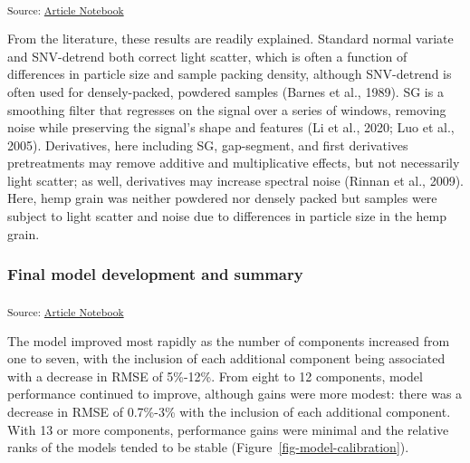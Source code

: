 \documentclass[
]{agujournal2019}
\begin{document}
\textsubscript{Source:
\href{https://rvcrawford.github.io/glowing-system/index.qmd.html}{Article
Notebook}}

From the literature, these results are readily explained. Standard
normal variate and SNV-detrend both correct light scatter, which is
often a function of differences in particle size and sample packing
density, although SNV-detrend is often used for densely-packed, powdered
samples (Barnes et al., 1989). SG is a smoothing filter that regresses
on the signal over a series of windows, removing noise while preserving
the signal's shape and features (Li et al., 2020; Luo et al., 2005).
Derivatives, here including SG, gap-segment, and first derivatives
pretreatments may remove additive and multiplicative effects, but not
necessarily light scatter; as well, derivatives may increase spectral
noise (Rinnan et al., 2009). Here, hemp grain was neither powdered nor
densely packed but samples were subject to light scatter and noise due
to differences in particle size in the hemp grain.

\subsubsection{Final model development and
summary}\label{final-model-development-and-summary}

\textsubscript{Source:
\href{https://rvcrawford.github.io/glowing-system/index.qmd.html}{Article
Notebook}}

The model improved most rapidly as the number of components increased
from one to seven, with the inclusion of each additional component being
associated with a decrease in RMSE of 5\%-12\%. From eight to 12
components, model performance continued to improve, although gains were
more modest: there was a decrease in RMSE of 0.7\%-3\% with the
inclusion of each additional component. With 13 or more components,
performance gains were minimal and the relative ranks of the models
tended to be stable (Figure~\ref{fig-model-calibration}).
\end{document}
